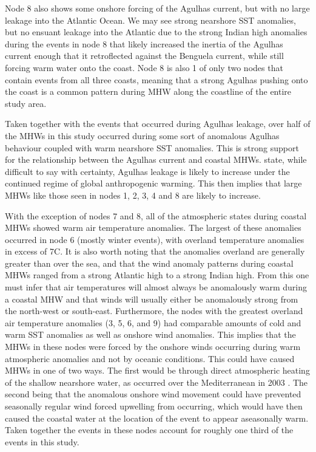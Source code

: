\documentclass[a4paper,10pt,review]{elsarticle}
\begin{document}
Node 8 also shows some onshore forcing of the Agulhas current, but with no large leakage into the Atlantic Ocean. We may see strong nearshore SST anomalies, but no ensuant leakage into the Atlantic due to the strong Indian high anomalies during the events in node 8 that likely increased the inertia of the Agulhas current enough that it retroflected against the Benguela current, while still forcing warm water onto the coast. Node 8 is also 1 of only two nodes that contain events from all three coasts, meaning that a strong Agulhas pushing onto the coast is a common pattern during MHW along the coastline of the entire study area.

Taken together with the events that occurred during Agulhas leakage, over half of the MHWs in this study occurred during some sort of anomalous Agulhas behaviour coupled with warm nearshore SST anomalies. This is strong support for the relationship between the Agulhas current and coastal MHWs. \citet{Beal2011} state, while difficult to say with certainty, Agulhas leakage is likely to increase under the continued regime of global anthropogenic warming. This then implies that large MHWs like those seen in nodes 1, 2, 3, 4 and 8 are likely to increase.

With the exception of nodes 7 and 8, all of the atmospheric states during coastal MHWs showed warm air temperature anomalies. The largest of these anomalies occurred in node 6 (mostly winter events), with overland temperature anomalies in excess of 7\degree C. It is also worth noting that the anomalies overland are generally greater than over the sea, and that the wind anomaly patterns during coastal MHWs ranged from a strong Atlantic high to a strong Indian high. From this one must infer that air temperatures will almost always be anomalously warm during a coastal MHW and that winds will usually either be anomalously strong from the north-west or south-east. Furthermore, the nodes with the greatest overland air temperature anomalies (3, 5, 6, and 9) had comparable amounts of cold and warm SST anomalies as well as onshore wind anomalies. This implies that the MHWs in these nodes were forced by the onshore winds occurring during warm atmospheric anomalies and not by oceanic conditions. This could have caused MHWs in one of two ways. The first would be through direct atmospheric heating of the shallow nearshore water, as occurred over the Mediterranean in 2003 \citep{Garrabou2009}. The second being that the anomalous onshore wind movement could have prevented seasonally regular wind forced upwelling from occurring, which would have then caused the coastal water at the location of the event to appear aseasonally warm. Taken together the events in these nodes account for roughly one third of the events in this study.
\end{document}
